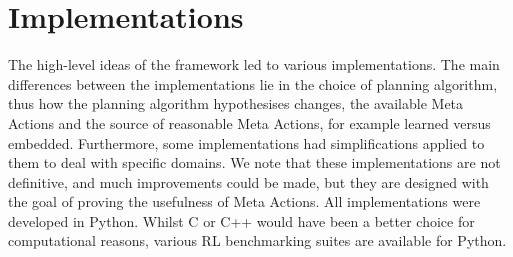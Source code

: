 \section{Implementations}
The high-level ideas of the framework led to various implementations. The main differences between the implementations lie in the choice of planning algorithm, thus how the planning algorithm hypothesises changes, the available Meta Actions and the source of reasonable Meta Actions, for example learned versus embedded. Furthermore, some implementations had simplifications applied to them to deal with specific domains. We note that these implementations are not definitive, and much improvements could be made, but they are designed with the goal of proving the usefulness of Meta Actions. All implementations were developed in Python. Whilst C or C++ would have been a better choice for computational reasons, various RL benchmarking suites are available for Python.
